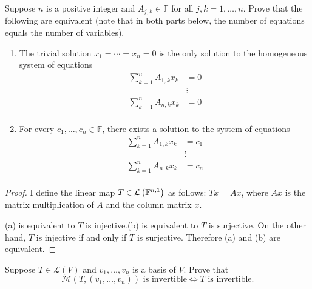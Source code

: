 \begin{exercise}\label{chapter3:sectionD:exercise21}
    Suppose $n$ is a positive integer and $A_{j, k} \in \mathbb{F}$ for all $j, k = 1, \ldots, n$. Prove that the following are equivalent (note that in both parts below, the number of equations equals the number of variables).
    \begin{enumerate}[label={(\alph*)}]
        \item The trivial solution $x_{1} = \cdots = x_{n} = 0$ is the only solution to the homogeneous system of equations
              \begin{align*}
                  \sum^{n}_{k=1} A_{1,k}x_{k} & = 0    \\
                                              & \vdots \\
                  \sum^{n}_{k=1} A_{n,k}x_{k} & = 0    \\
              \end{align*}
        \item For every $c_{1}, \ldots, c_{n}\in\mathbb{F}$, there exists a solution to the system of equations
              \begin{align*}
                  \sum^{n}_{k=1} A_{1,k}x_{k} & = c_{1} \\
                                              & \vdots  \\
                  \sum^{n}_{k=1} A_{n,k}x_{k} & = c_{n} \\
              \end{align*}
    \end{enumerate}
\end{exercise}

\begin{proof}
    I define the linear map $T\in\mathcal{L}\left({\mathbb{F}^{n,1}}\right)$ as follows: $Tx = Ax$, where $Ax$ is the matrix multiplication of $A$ and the column matrix $x$.

    (a) is equivalent to $T$ is injective.\@(b) is equivalent to $T$ is surjective. On the other hand, $T$ is injective if and only if $T$ is surjective. Therefore (a) and (b) are equivalent.
\end{proof}
\newpage

\begin{exercise}
    Suppose $T\in\mathcal{L}(V)$ and $v_{1},\ldots, v_{n}$ is a basis of $V$. Prove that
    \[
    \text{$\mathcal{M}(T, (v_{1}, \ldots, v_{n}))$ is invertible}\Longleftrightarrow \text{$T$ is invertible.}
    \]
\end{exercise}

